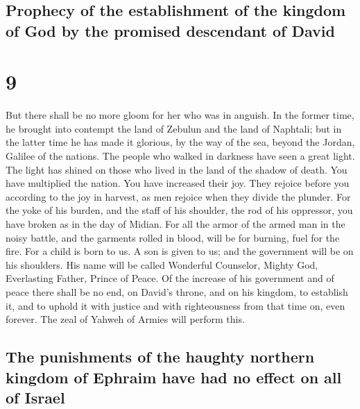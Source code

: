 \begin{paracol}{2}
\begin{otherlanguage}{english}
{\subsection{Prophecy of the establishment of the kingdom of God by the
promised descendant of
David}\label{prophecy-of-the-establishment-of-the-kingdom-of-god-by-the-promised-descendant-of-david}}

\hypertarget{section-17}{%
\section{9}\label{section-17}}

 But there shall be no more gloom for her who was in
anguish. In the former time, he brought into contempt the land of
Zebulun and the land of Naphtali; but in the latter time he has made it
glorious, by the way of the sea, beyond the Jordan, Galilee of the
nations.  The people who walked in darkness have seen a
great light. The light has shined on those who lived in the land of the
shadow of death.  You have multiplied the nation. You have
increased their joy. They rejoice before you according to the joy in
harvest, as men rejoice when they divide the plunder.  For
the yoke of his burden, and the staff of his shoulder, the rod of his
oppressor, you have broken as in the day of Midian.  For
all the armor of the armed man in the noisy battle, and the garments
rolled in blood, will be for burning, fuel for the fire. 
For a child is born to us. A son is given to us; and the government will
be on his shoulders. His name will be called Wonderful Counselor, Mighty
God, Everlasting Father, Prince of Peace.  Of the increase
of his government and of peace there shall be no end, on David's throne,
and on his kingdom, to establish it, and to uphold it with justice and
with righteousness from that time on, even forever. The zeal of Yahweh
of Armies will perform this.

\hypertarget{the-punishments-of-the-haughty-northern-kingdom-of-ephraim-have-had-no-effect-on-all-of-israel}{%
\subsection{The punishments of the haughty northern kingdom of Ephraim
have had no effect on all of
Israel}\label{the-punishments-of-the-haughty-northern-kingdom-of-ephraim-have-had-no-effect-on-all-of-israel}}


\end{otherlanguage}
\end{paracol}
